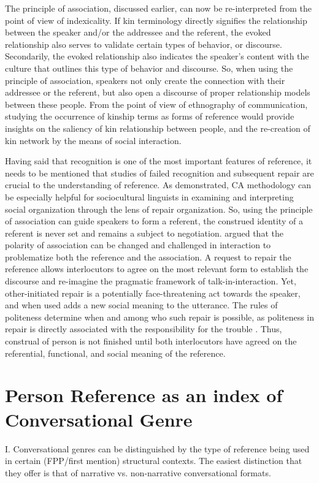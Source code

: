 \documentclass[12pt]{turabian-researchpaper}
\begin{document}
The principle of association, discussed earlier, can now be re-interpreted from the point of view of indexicality. If kin terminology directly signifies the relationship between the speaker and/or the addressee and the referent, the evoked relationship also serves to validate certain types of behavior, or discourse. Secondarily, the evoked relationship also indicates the speaker's content with the culture that outlines this type of behavior and discourse. So, when using the principle of association, speakers not only create the connection with their addressee or the referent, but also open a discourse of proper relationship models between these people. From the point of view of ethnography of communication, studying the occurrence of kinship terms as forms of reference would provide insights on the saliency of kin relationship between people, and the re-creation of kin network by the means of social interaction.

Having said that recognition is one of the most important features of reference, it needs to be mentioned that studies of failed recognition and subsequent repair are crucial to the understanding of reference. As \textcite{sidnell2008} demonstrated, CA methodology can be especially helpful for sociocultural linguists in examining and interpreting social organization through the lens of repair organization. So, using the principle of association can guide speakers to form a referent, the construed identity of a referent is never set and remains a subject to negotiation. \textcite{blythe2009} argued that the polarity of association can be changed and challenged in interaction to problematize both the reference and the association. A request to repair the reference allows interlocutors to agree on the most relevant form to establish the discourse and re-imagine the pragmatic framework of talk-in-interaction. Yet, other-initiated repair is a potentially face-threatening act towards the speaker, and when used adds a new social meaning to the utterance. The rules of politeness determine when and among who such repair is possible, as politeness in repair is directly associated with the responsibility for the trouble \parencite{sidnell2008}. Thus, construal of person is not finished until both interlocutors have agreed on the referential, functional, and social meaning of the reference.

\section{Person Reference as an index of Conversational Genre}
I.	Conversational genres can be distinguished by the type of reference being used in certain (FPP/first mention) structural contexts. The easiest distinction that they offer is that of narrative vs. non-narrative conversational formats.
\end{document}
